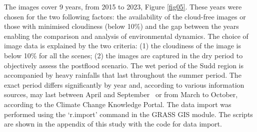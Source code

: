 \documentclass[analytics,article,accept,pdftex,moreauthors]{Definitions/mdpi}
\begin{document}
 The images cover 9 years, from 2015 to 2023, Figure \ref{fig05}. {These years were chosen for the two following factors: the availability of the cloud-free images or those with minimised cloudiness (below 10\%) and the gap between the years enabling the comparison and analysis of  environmental dynamics.} %
The choice of image data is explained by the two criteria: (1) the cloudiness of the image is below 10\% for all the scenes; (2) the images are captured in the dry period to objectively assess the postflood scenario. %
The wet period of the Sudd region is accompanied by heavy rainfalls that last throughout the summer period. %
The exact period differs significantly by year and, according to various information sources, may last between April and September~\cite{MartinBurgess} or from March to October, according to the Climate Change Knowledge Portal. {The data import was performed using the `r.import' command in the GRASS GIS module. The scripts are shown in the appendix of this study with the code for data import.}
\end{document}
